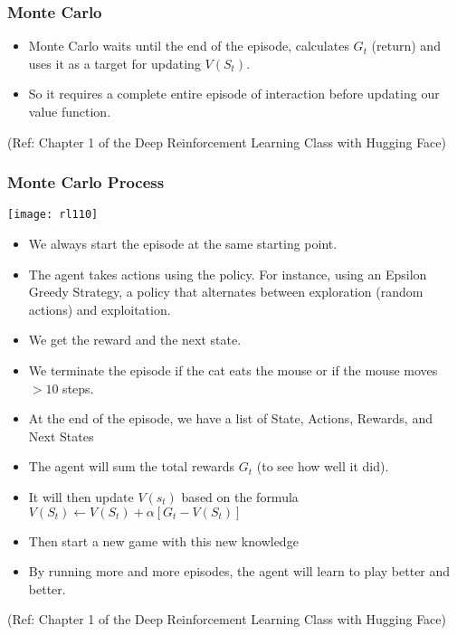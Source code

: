 \begin{frame}[fragile]\frametitle{Monte Carlo}


\begin{itemize}
\item Monte Carlo waits until the end of the episode, calculates $G_t$ (return) and uses it as a target for updating $V(S_t)$.
\item So it requires a complete entire episode of interaction before updating our value function.
\end{itemize}

{\tiny (Ref: Chapter 1 of the Deep Reinforcement Learning Class with Hugging Face)}


\end{frame}

\begin{frame}[fragile]\frametitle{Monte Carlo Process}


\begin{center}
\texttt{[image: rl110]}
\end{center}


\begin{itemize}
\item We always start the episode at the same starting point.
\item The agent takes actions using the policy. For instance, using an Epsilon Greedy Strategy, a policy that alternates between exploration (random actions) and exploitation.
\item We get the reward and the next state.
\item We terminate the episode if the cat eats the mouse or if the mouse moves $> 10$ steps.
\item At the end of the episode, we have a list of State, Actions, Rewards, and Next States
\item  The agent will sum the total rewards $G_t$ (to see how well it did).
\item It will then update $V(s_t)$ based on the formula $V(S_t) \leftarrow V(S_t) + \alpha [ G_t - V(S_t)]$
\item Then start a new game with this new knowledge
\item By running more and more episodes, the agent will learn to play better and better.
\end{itemize}


{\tiny (Ref: Chapter 1 of the Deep Reinforcement Learning Class with Hugging Face)}

\end{frame}


